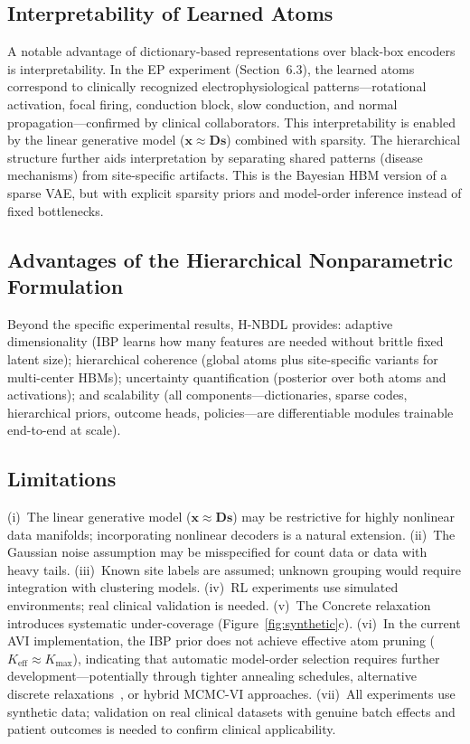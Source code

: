 \documentclass[11pt,a4paper]{article}
\theoremstyle{definition}
\begin{document}
\subsection{Interpretability of Learned Atoms}

A notable advantage of dictionary-based representations over black-box encoders is interpretability. In the EP experiment (Section~6.3), the learned atoms correspond to clinically recognized electrophysiological patterns---rotational activation, focal firing, conduction block, slow conduction, and normal propagation---confirmed by clinical collaborators. This interpretability is enabled by the linear generative model ($\mathbf{x} \approx \mathbf{D}\mathbf{s}$) combined with sparsity. The hierarchical structure further aids interpretation by separating shared patterns (disease mechanisms) from site-specific artifacts. This is the Bayesian HBM version of a sparse VAE, but with explicit sparsity priors and model-order inference instead of fixed bottlenecks.

\subsection{Advantages of the Hierarchical Nonparametric Formulation}

Beyond the specific experimental results, H-NBDL provides: adaptive dimensionality (IBP learns how many features are needed without brittle fixed latent size); hierarchical coherence (global atoms plus site-specific variants for multi-center HBMs); uncertainty quantification (posterior over both atoms and activations); and scalability (all components---dictionaries, sparse codes, hierarchical priors, outcome heads, policies---are differentiable modules trainable end-to-end at scale).

\subsection{Limitations}

(i)~The linear generative model ($\mathbf{x} \approx \mathbf{D}\mathbf{s}$) may be restrictive for highly nonlinear data manifolds; incorporating nonlinear decoders is a natural extension. (ii)~The Gaussian noise assumption may be misspecified for count data or data with heavy tails. (iii)~Known site labels are assumed; unknown grouping would require integration with clustering models. (iv)~RL experiments use simulated environments; real clinical validation is needed. (v)~The Concrete relaxation introduces systematic under-coverage (Figure~\ref{fig:synthetic}c). (vi)~In the current AVI implementation, the IBP prior does not achieve effective atom pruning ($K_{\mathrm{eff}} \approx K_{\max}$), indicating that automatic model-order selection requires further development---potentially through tighter annealing schedules, alternative discrete relaxations~\citep{jang2017}, or hybrid MCMC-VI approaches. (vii)~All experiments use synthetic data; validation on real clinical datasets with genuine batch effects and patient outcomes is needed to confirm clinical applicability.
\end{document}
